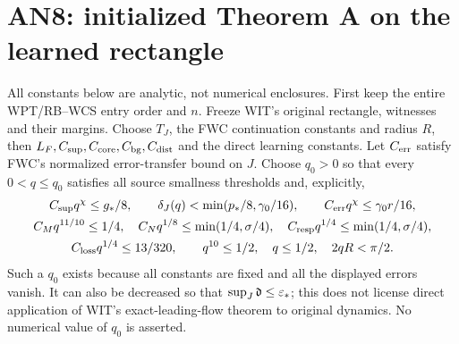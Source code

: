 \documentclass[11pt]{article}
\numberwithin{equation}{section}
\begin{document}
\section{AN8: initialized Theorem A on the learned rectangle}
\label{an07rtav1:assembly}
All constants below are analytic, not numerical enclosures.
First keep the entire WPT/RB--WCS entry order and \(n\).
Freeze WIT's original rectangle, witnesses and their margins.
Choose \(T_J\), the FWC continuation constants and radius \(R\),
then \(L_F,C_{\rm sup},C_{\rm core},C_{\rm bg},C_{\rm dist}\)
and the direct learning constants. Let \(C_{\rm err}\) satisfy
FWC's normalized error-transfer bound on \(J\).
Choose \(q_0>0\) so that every \(0<q\le q_0\) satisfies all
source smallness thresholds and, explicitly,
\begin{gather}
 C_{\rm sup}q^\chi\le g_*/8,\qquad
 \delta_J(q)<\min(p_*/8,\gamma_0/16),\qquad
 C_{\rm err}q^\chi\le\gamma_0r/16,\notag\\
 C_Mq^{11/10}\le1/4,\quad
 C_Nq^{1/8}\le\min(1/4,\sigma/4),\quad
 C_{\rm resp}q^{1/4}\le\min(1/4,\sigma/4),\notag\\
 C_{\rm loss}q^{1/4}\le13/320,\qquad
 q^{10}\le1/2,\quad q\le1/2,\quad 2qR<\pi/2.
 \label{an07rtav1:q0}
\end{gather}
Such a \(q_0\) exists because all constants are fixed and all
the displayed errors vanish. It can also be decreased so that
\(\sup_J\mathfrak d\le\varepsilon_*\); this does not license direct
application of WIT's exact-leading-flow theorem to original dynamics.
No numerical value of \(q_0\) is asserted.
\end{document}
